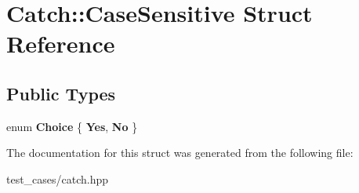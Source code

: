 \hypertarget{structCatch_1_1CaseSensitive}{}\section{Catch\+:\+:Case\+Sensitive Struct Reference}
\label{structCatch_1_1CaseSensitive}
\subsection*{Public Types}
\begin{DoxyCompactItemize}
\item 
\mbox{\label{structCatch_1_1CaseSensitive_aad49d3aee2d97066642fffa919685c6a}} 
enum {\bfseries Choice} \{ {\bfseries Yes}, 
{\bfseries No}
 \}
\end{DoxyCompactItemize}


The documentation for this struct was generated from the following file\+:\begin{DoxyCompactItemize}
\item 
test\+\_\+cases/catch.\+hpp\end{DoxyCompactItemize}
